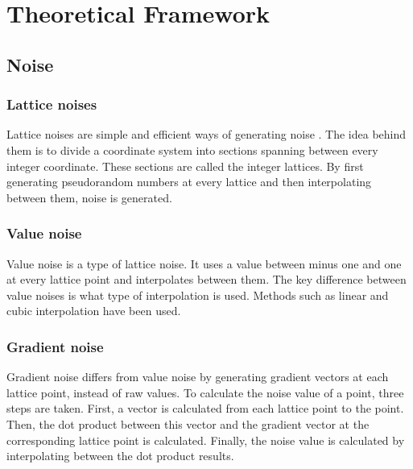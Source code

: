 \section{Theoretical Framework}
	\subsection{Noise}
		\subsubsection{Lattice noises}
		Lattice noises are simple and efficient ways of generating noise\cite{TexturingModeling} . The idea behind them is to divide a coordinate system into sections spanning between every integer coordinate. These sections are called the integer lattices. By first generating pseudorandom numbers at every lattice and then interpolating between them, noise is generated.
		
		\subsubsection{Value noise}
		Value noise is a type of lattice noise. It uses a value between minus one and one at every lattice point and interpolates between them. The key difference between value noises is what type of interpolation is used. Methods such as linear and cubic interpolation have been used\cite{TexturingModeling}.
		
		\subsubsection{Gradient noise}
		Gradient noise differs from value noise by generating gradient vectors at each lattice point, instead of raw values. To calculate the noise value of a point, three steps are taken. First, a vector is calculated from each lattice point to the point.  Then, the dot product between this vector and the gradient vector at the corresponding lattice point is calculated. Finally, the noise value is calculated by interpolating between the dot product results.
		

